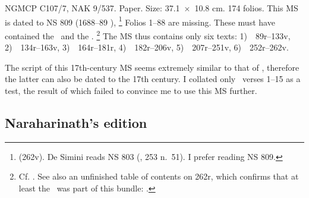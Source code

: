 NGMCP C107/7, NAK 9/537. Paper. Size: 
37.1~×~10.8 cm. 174 folios. This MS is
dated to NS 809 (1688--89 \CE),%
		\footnote{ (\fol262v). 
		De Simini reads NS 803
		(\citeyear{DeSiminiMSSFromNepal2016}, 253 n.~51).
		I prefer reading NS 809. }
Folios 1--88 are missing. These must have contained the \SDhS\ and the \SDhU.%
			\footnote{Cf. 
				. 
				See also an unfinished table of contents on \fol262r,
				which confirms that at least the \SDhS\ was part 
				of this bundle: .}
The MS thus contains only six texts:
1)~\SDhSangr\ \fols89r--133v,
2)~\Ums\ \fols134r--163v,
3)~\SivaUp\ \fols164r--181r,
4)~\Uums\ \fols182r--206v,
5)~\Vss\ \fols207r--251v, %
6)~\DharmP\ \fols252r--262v. 

The script of this 17th-century MS seems 
extremely similar to that of \msPaperA, 
therefore the latter can also be
dated to the 17th century. I collated only \VSS\ verses 1--15
as a test, the result of which failed to convince me to use this MS further.




\medskip
\subsection{Naraharinath's edition}

